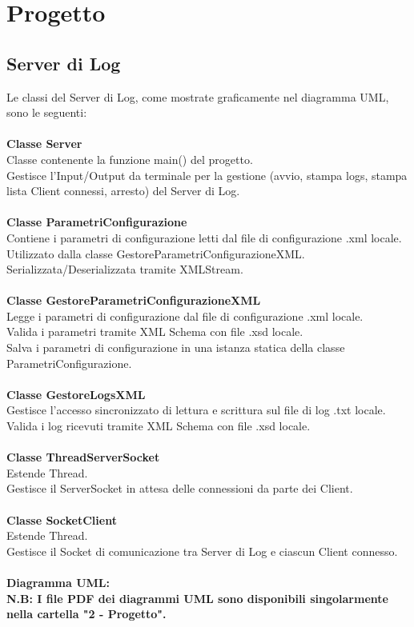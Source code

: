 \documentclass[a4paper, 11pt]{article} %
\begin{document}

\newpage
\section{Progetto}

\subsection{Server di Log}

Le classi del Server di Log, come mostrate graficamente nel diagramma UML, sono le seguenti:\\
\\
\textbf{Classe Server}\\
Classe contenente la funzione main() del progetto.\\
Gestisce l'Input/Output da terminale per la gestione (avvio, stampa logs, stampa lista Client connessi, arresto) del Server di Log.\\
\\
\textbf{Classe ParametriConfigurazione}\\
Contiene i parametri di configurazione letti dal file di configurazione .xml locale.\\
Utilizzato dalla classe GestoreParametriConfigurazioneXML.\\
Serializzata/Deserializzata tramite XMLStream.\\
\\
\textbf{Classe GestoreParametriConfigurazioneXML}\\
Legge i parametri di configurazione dal file di configurazione .xml locale.\\
Valida i parametri tramite XML Schema con file .xsd locale.\\
Salva i parametri di configurazione in una istanza statica della classe ParametriConfigurazione.\\
\\
\textbf{Classe GestoreLogsXML}\\
Gestisce l'accesso sincronizzato di lettura e scrittura sul file di log .txt locale.\\
Valida i log ricevuti tramite XML Schema con file .xsd locale.\\
\\
\textbf{Classe ThreadServerSocket}\\
Estende Thread.\\
Gestisce il ServerSocket in attesa delle connessioni da parte dei Client.\\
\\
\textbf{Classe SocketClient}\\
Estende Thread.\\
Gestisce il Socket di comunicazione tra Server di Log e ciascun Client connesso.\\
\\
\textbf{Diagramma UML:}\\
\textbf{N.B: I file PDF dei diagrammi UML sono disponibili singolarmente nella cartella "2 - Progetto".}
\clearpage

\end{document}
